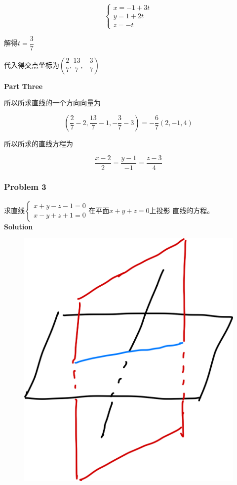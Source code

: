 \documentclass[12pt, a4paper]{article}
\numberwithin{equation}{section}
\begin{document}
    $$
        \left\{\begin{array}{l}
        x=-1+3 t \\
        y=1+2 t \\
        z=-t
        \end{array}\right.
    $$

    解得\(t=\dfrac{3}{7}\)

    代入得交点坐标为$\left(\dfrac{2}{7}, \dfrac{13}{7},-\dfrac{3}{7}\right)$

    \textbf{Part Three}

    所以所求直线的一个方向向量为

    $$
        \left(\frac{2}{7}-2, \frac{13}{7}-1,-\frac{3}{7}-3\right)=-\frac{6}{7}(2,-1,4)
    $$

    所以所求的直线方程为

    $$
        \frac{x-2}{2}=\frac{y-1}{-1}=\frac{z-3}{4}
    $$

\subsubsection{Problem 3}

    求直线$\left\{\begin{array}{l}x+y-z-1=0 \\ x-y+z+1=0\end{array}\right.$在平面\(x+y+z=0\)上投影
    直线的方程。
    \\

    \textbf{Solution}
    \\

    \begin{figure}
        \centering
        \includegraphics[scale=0.08]{"Chapter 08 images/pic2.png"}
        \label{pic2}
    \end{figure}
\end{document}
